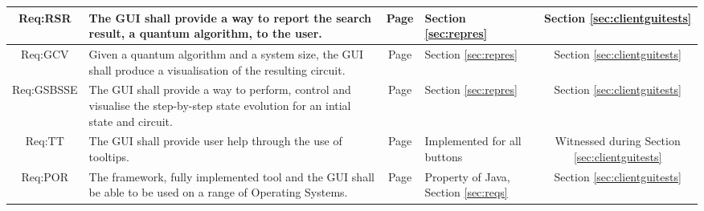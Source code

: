 \begin{landscape}
\begin{longtable}{|c|m{10cm}|c|m{3cm}|m{3cm}|}
Req:RSR &
The GUI shall provide a way to report the search result, a quantum algorithm, to the user. &
Page \pageref{sec:reqrsr} &
Section \ref{sec:repres} &
\multicolumn{1}{c|}{Section \ref{sec:clientguitests}} \\ \hline

Req:GCV &
Given a quantum algorithm and a system size, the GUI shall produce a visualisation of the resulting circuit. &
Page \pageref{sec:reqgcv} &
Section \ref{sec:repres} &
\multicolumn{1}{c|}{Section \ref{sec:clientguitests}} \\ \hline

Req:GSBSSE &
The GUI shall provide a way to perform, control and visualise the step-by-step state evolution for an intial state and circuit. &
Page \pageref{sec:reqgsbsse} &
Section \ref{sec:repres} &
\multicolumn{1}{c|}{Section \ref{sec:clientguitests}} \\ \hline

Req:TT &
The GUI shall provide user help through the use of tooltips. &
Page \pageref{sec:reqtt} &
Implemented for all buttons&
\multicolumn{1}{c|}{Witnessed during Section \ref{sec:clientguitests}} \\ \hline

Req:POR &
The framework, fully implemented tool and the GUI shall be able to be used on a range of Operating Systems. &
Page \pageref{sec:reqpor} &
Property of Java, Section \ref{sec:reqs} &
\multicolumn{1}{c|}{Section \ref{sec:clientguitests}} \\ \hline

\end{longtable}
\end{landscape}
\clearpage